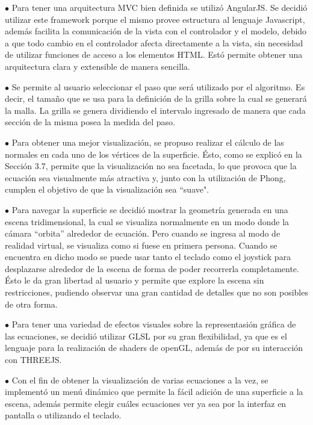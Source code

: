 \documentclass[12pt]{article}
\begin{document}
$\bullet$ Para tener una arquitectura MVC bien definida se utilizó AngularJS. Se decidió utilizar este framework porque el mismo provee estructura al lenguaje Javascript, además facilita la comunicación de la vista con el controlador y el modelo, debido a que todo cambio en el controlador afecta directamente a la vista, sin necesidad de utilizar funciones de acceso a los elementos HTML. Estó permite obtener una arquitectura clara y extensible de manera sencilla.

$\bullet$ Se permite al usuario seleccionar el paso que será utilizado por el algoritmo. Es decir, el tamaño que se usa para la definición de la grilla sobre la cual se generará la malla. La grilla se genera dividiendo el intervalo ingresado de manera que cada sección de la misma posea la medida del paso. 

$\bullet$ Para obtener una mejor visualización, se propuso realizar el cálculo de las normales en cada uno  de los vértices de la superficie. Ésto, como se explicó en la Sección 3.7, permite que la visualización no sea facetada, lo que provoca que la ecuación sea visualmente más atractiva y, junto con la utilización de Phong, cumplen el objetivo de que la visualización sea ``suave". 

$\bullet$ Para navegar la superficie se decidió mostrar la geometría generada en una escena tridimensional, la cual se visualiza normalmente en un modo donde la cámara “orbita” alrededor de ecuación. Pero cuando se ingresa al modo de realidad virtual, se visualiza como si fuese en primera persona. Cuando se encuentra en dicho modo se puede usar tanto el teclado como el joystick para desplazarse alrededor de la escena de forma de poder recorrerla completamente. Ésto le da gran libertad al usuario y permite que explore la escena sin restricciones, pudiendo observar una gran cantidad de detalles que no son posibles de otra forma.


$\bullet$ Para tener una variedad de efectos visuales sobre la representasión gráfica de las ecuaciones, se decidió utilizar GLSL por su gran flexibilidad, ya que es el lenguaje para la realización de shaders de openGL, además de por su interacción con THREEJS. 

$\bullet$ Con el fin de obtener la visualización de varias ecuaciones a la vez, se implementó un menú dinámico que permite la fácil adición de una superficie a la escena, además permite elegir cuáles ecuaciones ver ya sea por la interfaz en pantalla o utilizando el teclado.
\end{document}

